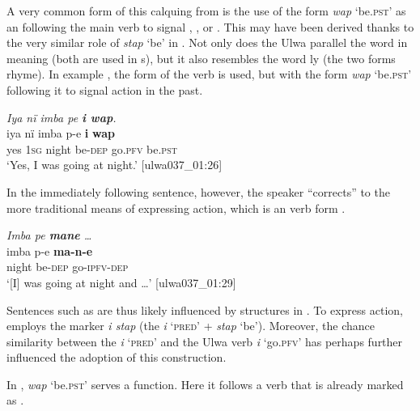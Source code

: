 
  A very common form of this  calquing from  is the use of the  form \textit{wap} ‘be.\textsc{pst}’ as an  following the main verb to signal , , or  . This may have been derived thanks to the very similar role of \textit{stap} ‘be’ in . Not only does the Ulwa  parallel the  word in meaning (both are used in s), but it also resembles the  word ly (the two forms rhyme). In example , the  form of the verb is used, but with the form \textit{wap} ‘be.\textsc{pst’} following it to signal  action in the past.

\ea%
    \label{ex:loss:1}
            \textit{Iya nï imba pe \textbf{i wap}.}\\
\gll iya  nï    imba  p-e    \textbf{i}  \textbf{wap}\\
    yes  1\textsc{sg}  night  be-\textsc{dep}  go.\textsc{pfv}  be.\textsc{pst}\\
\glt `Yes, I was going at night.’ [ulwa037\_01:26]
\z

In the immediately following sentence, however, the speaker “corrects” to the more traditional means of expressing   action, which is an  verb form .

\newpage

\ea%
    \label{ex:loss:2}
            \textit{Imba pe \textbf{mane} …}\\
\gll imba  p-e    \textbf{ma-n-e}\\
    night  be-\textsc{dep}  go-\textsc{ipfv-dep}\\
\glt `[I] was going at night and …’ [ulwa037\_01:29]
\z

Sentences such as  are thus likely influenced by structures in . To express  action,  employs the marker \textit{i stap} (the  \textit{i} ‘\textsc{pred’} + \textit{stap} ‘be’). Moreover, the chance similarity between the   \textit{i} ‘\textsc{pred’} and the Ulwa verb \textit{i} ‘go.\textsc{pfv}’ has perhaps further influenced the adoption of this construction.

  In , \textit{wap} ‘be.\textsc{pst’} serves a  function. Here it follows a verb that is already marked as .


